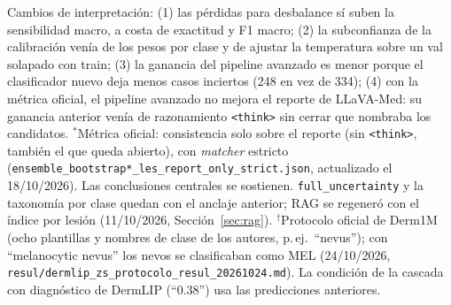 \documentclass[11pt, a4paper]{article}
\begin{document}
{\begin{minipage}{\dimexpr\textwidth-2\fboxsep-2\fboxrule\relax}
\smallskip
\raggedright
Cambios de interpretación: (1) las pérdidas para desbalance sí suben la sensibilidad macro, a costa de
exactitud y F1 macro; (2) la subconfianza de la calibración venía de los pesos por clase y de ajustar la
temperatura sobre un val solapado con train; (3) la ganancia del pipeline avanzado es menor porque el
clasificador nuevo deja menos casos inciertos (248 en vez de 334); (4) con la métrica oficial, el
pipeline avanzado no mejora el reporte de LLaVA-Med: su ganancia anterior venía de razonamiento
\texttt{<think>} sin cerrar que nombraba los candidatos. $^{\ast}$Métrica oficial: consistencia solo sobre el
reporte (sin \texttt{<think>}, también el que queda abierto), con \emph{matcher} estricto
(\texttt{ensemble\_bootstrap*\_les\_report\_only\_strict.json}, actualizado el 18/10/2026). Las conclusiones
centrales se sostienen. \texttt{full\_uncertainty} y la taxonomía por clase quedan con el anclaje anterior; RAG se
regeneró con el índice por lesión (11/10/2026, Sección~\ref{sec:rag}). $^{\dagger}$Protocolo oficial de Derm1M (ocho plantillas y nombres de clase de los autores, p.\,ej.\ ``nevus''); con ``melanocytic nevus'' los nevos se clasificaban como MEL (24/10/2026, \texttt{resul/dermlip\_zs\_protocolo\_resul\_20261024.md}). La condición de la cascada con diagnóstico de DermLIP (``0.38'') usa las predicciones anteriores.
\end{minipage}}
\bigskip
\end{document}
